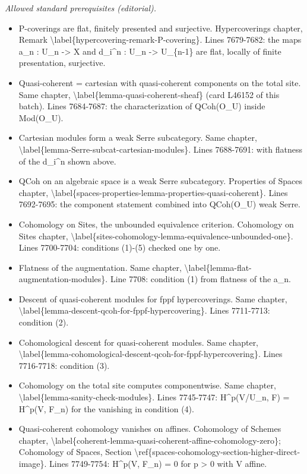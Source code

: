 \documentclass{stacks-project}
\theoremstyle{plain}
\theoremstyle{definition}
\theoremstyle{remark}
\numberwithin{equation}{subsection}
\begin{document}
\noindent\textit{Allowed standard prerequisites (editorial).}\begin{itemize}
\item P-coverings are flat, finitely presented and surjective. Hypercoverings chapter, Remark \textbackslash{}label\{hypercovering-remark-P-covering\}. Lines 7679-7682: the maps a\_n : U\_n -> X and d\_i\textasciicircum{}n : U\_n -> U\_\{n-1\} are flat, locally of finite presentation, surjective.
\item Quasi-coherent = cartesian with quasi-coherent components on the total site. Same chapter, \textbackslash{}label\{lemma-quasi-coherent-sheaf\} (card L46152 of this batch). Lines 7684-7687: the characterization of QCoh(O\_U) inside Mod(O\_U).
\item Cartesian modules form a weak Serre subcategory. Same chapter, \textbackslash{}label\{lemma-Serre-subcat-cartesian-modules\}. Lines 7688-7691: with flatness of the d\_i\textasciicircum{}n shown above.
\item QCoh on an algebraic space is a weak Serre subcategory. Properties of Spaces chapter, \textbackslash{}label\{spaces-properties-lemma-properties-quasi-coherent\}. Lines 7692-7695: the component statement combined into QCoh(O\_U) weak Serre.
\item Cohomology on Sites, the unbounded equivalence criterion. Cohomology on Sites chapter, \textbackslash{}label\{sites-cohomology-lemma-equivalence-unbounded-one\}. Lines 7700-7704: conditions (1)-(5) checked one by one.
\item Flatness of the augmentation. Same chapter, \textbackslash{}label\{lemma-flat-augmentation-modules\}. Line 7708: condition (1) from flatness of the a\_n.
\item Descent of quasi-coherent modules for fppf hypercoverings. Same chapter, \textbackslash{}label\{lemma-descent-qcoh-for-fppf-hypercovering\}. Lines 7711-7713: condition (2).
\item Cohomological descent for quasi-coherent modules. Same chapter, \textbackslash{}label\{lemma-cohomological-descent-qcoh-for-fppf-hypercovering\}. Lines 7716-7718: condition (3).
\item Cohomology on the total site computes componentwise. Same chapter, \textbackslash{}label\{lemma-sanity-check-modules\}. Lines 7745-7747: H\textasciicircum{}p(V/U\_n, F) = H\textasciicircum{}p(V, F\_n) for the vanishing in condition (4).
\item Quasi-coherent cohomology vanishes on affines. Cohomology of Schemes chapter, \textbackslash{}label\{coherent-lemma-quasi-coherent-affine-cohomology-zero\}; Cohomology of Spaces, Section \textbackslash{}ref\{spaces-cohomology-section-higher-direct-image\}. Lines 7749-7754: H\textasciicircum{}p(V, F\_n) = 0 for p > 0 with V affine.
\end{itemize}\medskip
\end{document}
